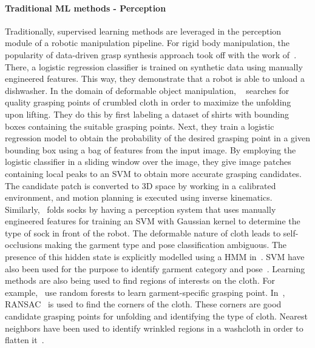 \documentclass[\home/main.tex]{subfiles}
\begin{document}
\paragraph{Traditional ML methods - Perception}
Traditionally, supervised learning methods are leveraged in the perception module of a robotic manipulation pipeline. For rigid body manipulation, the popularity of data-driven grasp synthesis approach took off with the work of~\textcite{Saxena2008}. There, a logistic regression classifier is trained on synthetic data using manually engineered features. This way, they demonstrate that a robot is able to unload a dishwasher. In the domain of deformable object manipulation, ~\textcite{Ramisa2012} searches for quality grasping points of crumbled cloth in order to maximize the unfolding upon lifting. They do this by first labeling a dataset of shirts with bounding boxes containing the suitable grasping points. Next, they train a logistic regression model to obtain the probability of the desired grasping point in a given bounding box using a bag of features from the input image. By employing the logistic classifier in a sliding window over the image, they give image patches containing local peaks to an \acrshort{SVM} to obtain more accurate grasping candidates. The candidate patch is converted to 3D space by working in a calibrated environment, and motion planning is executed using inverse kinematics. Similarly,~\textcite{Wang2011} folds socks by having a perception system that uses manually engineered features for training an \acrshort{SVM} with Gaussian kernel to determine the type of sock in front of the robot. The deformable nature of cloth leads to self-occlusions making the garment type and pose classification ambiguous. The presence of this hidden state is explicitly modelled using a \acrshort{HMM} in~\autocite{Cusumano2011}. \acrshort{SVM} have also been used for the purpose to identify garment category and pose~\autocite{Li2014, li2014volum}. Learning methods are also being used to find regions of interests on the cloth. For example,~\textcite{Doumanoglou2016} use random forests to learn garment-specific grasping point. In~\autocite{Maitin2010}, RANSAC~\autocite{RANSAC} is used to find the corners of the cloth. These corners are good candidate grasping points for unfolding and identifying the type of cloth. Nearest neighbors have been used to identify wrinkled regions in a washcloth in order to flatten it~\autocite{Willimon2011}.
\end{document}
